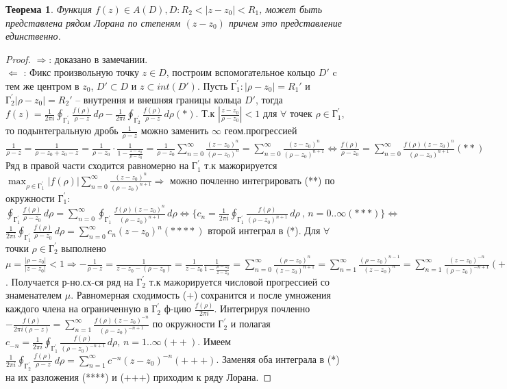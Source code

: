 \documentclass{article}
\newtheorem{theorem}{Теорема}[]
\begin{document}
\begin{theorem}
    Функция $f(z)\in A(D), D: R_2<|z-z_0|<R_1$, может быть представлена рядом Лорана по степеням $(z-z_0)$ причем это представление единственно.
\end{theorem}
\begin{proof}
$\Longrightarrow$: доказано в замечании.\\
$\Longleftarrow$ : Фикс произвольную точку $z \in D$, построим вспомогательное кольцо $D'$ c тем же центром в $z_0$, $D' \subset D$ и $z \subset int(D')$. Пусть $\text{Г}_1^{'}: |\rho - z_0|=R_1'$ и $\text{Г}_2^{'}|\rho - z_0|=R_2'$ -- внутрення и внешняя границы кольца $D'$, тогда $f(z) = \frac{1}{2\pi i} \oint_{ \text{Г}_1^{'}} \frac{f(\rho)}{\rho - z} \,d\rho - \frac{1}{2\pi i} \oint_{ \text{Г}_2^{'}} \frac{f(\rho)}{\rho - z} \,d\rho(*)$. Т.к $|\frac{z-z_0}{\rho-z_0}|<1$ для $\forall$ точек $\rho \in \text{Г}_1^{'}$, то подынтегральную дробь $\frac{1}{\rho-z}$ можно заменить $\infty$ геом.прогрессией $\frac{1}{\rho-z} = \frac{1}{\rho-z_0+z_0-z}=\frac{1}{\rho-z_0}\cdot\frac{1}{1-\frac{z-z_0}{\rho-z_0}} = \frac{1}{\rho-z_0}\sum_{n=0}^{\infty}\frac{(z-z_0)^n}{(\rho-z_0)^n} = \sum_{n=0}^{\infty}\frac{(z-z_0)^n}{(\rho-z_0)^{n+1}} \Longleftrightarrow \frac{f(\rho)}{\rho-z_0}=\sum_{n=0}^{\infty}\frac{f(\rho)(z-z_0)^n}{(\rho-z_0)^{n+1}}(**)$ Ряд в правой части сходится равномерно на $\text{Г}_1^{'}$ т.к мажорируется $\max_{\rho \in \text{Г}_1^{'}}|f(\rho)|\sum_{n=0}^{\infty}\frac{(z-z_0)^n}{(\rho-z_0)^{n+1}} \Rightarrow$ можно почленно интегрировать (**) по окружности $\text{Г}_1^{'}$: $\oint_{ \text{Г}_1^{'}}\frac{f(\rho)}{\rho-z_0} \,d\rho =\sum_{n=0}^{\infty} \oint_{ \text{Г}_1^{'}} \frac{f(\rho)(z-z_0)^n}{(\rho-z_0)^{n+1}} \,d\rho \Longleftrightarrow \{ c_n = \frac{1}{2\pi i} \oint_{ \text{Г}_1^{'}} \frac{f(\rho)}{(\rho-z_0)^{n+1}} \,d\rho\ \text{, }n=0..\infty(***)\}\Longleftrightarrow$  $\frac{1}{2\pi i}\oint_{ \text{Г}_1^{'}}\frac{f(\rho)}{\rho-z_0} \,d\rho = \sum_{n=0}^{\infty}c_n(z-z_0)^n(****)$
\bigbreak
{} второй интеграл в (*). Для $\forall$ точки $\rho \in  \text{Г}_2^{'}$ выполнено $\mu=\frac{|\rho-z_0|}{|z-z_0|}<1 \Rightarrow -\frac{1}{\rho-z} = \frac{1}{z-z_0-(\rho-z_0)} = \frac{1}{z-z_0}\frac{1}{1-\frac{\rho-z_0}{z-z_0}}=\sum_{n=0}^{\infty}\frac{(\rho-z_0)^n}{(z-z_0)^{n+1}}=\sum_{n=1}^{\infty}\frac{(\rho-z_0)^{n-1}}{(z-z_0)^{n}}=
\sum_{n=1}^{\infty}\frac{(z-z_0)^{-n} }{(\rho-z_0)^{-n+1}}(+)$. Получается р-но.сх-ся ряд на $\text{Г}_2^{'}$ т.к мажорируется числовой прогрессией со знаменателем $\mu$. Равномерная сходимость (+) сохранится и после умножения каждого члена на ограниченную в $\text{Г}_2^{'}$ ф-цию $\frac{f(\rho)}{2\pi i}$. Интегрируя почленно $-\frac{f(\rho)}{2\pi i(\rho-z)}=\sum_{n=1}^{\infty}\frac{f(\rho)(z-z_0)^{-n} }{(\rho-z_0)^{-n+1}}$ по окружности $\text{Г}_2^{'}$ и полагая $c_{-n} = \frac{1}{2\pi i} \oint_{ \text{Г}_1^{'}} \frac{f(\rho)}{(\rho-z_0)^{-n+1}} \,d\rho \text{, }n=1..\infty (++)$. Имеем $\frac{1}{2\pi i} \oint_{ \text{Г}_2^{'}} \frac{f(\rho)}{\rho-z} \,d\rho = \sum_{n=1}^{\infty} c^{-n}(z-z_0)^{-n}(+++)$. Заменяя оба интеграла в (*) на их разложения (****) и (+++) приходим к ряду Лорана.
\end{proof}
\end{document}
